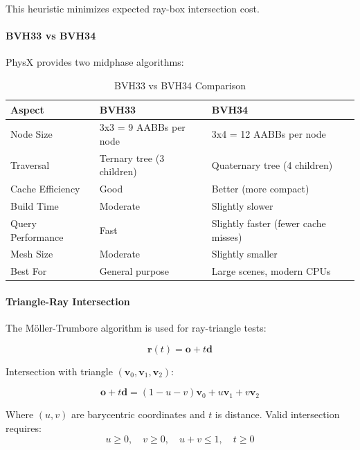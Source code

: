 This heuristic minimizes expected ray-box intersection cost.

\paragraph{BVH33 vs BVH34}

PhysX provides two midphase algorithms:

\begin{table}[h]
\centering
\begin{tabular}{|l|p{6cm}|p{6cm}|}
\hline
\textbf{Aspect} & \textbf{BVH33} & \textbf{BVH34} \\
\hline
Node Size & 3x3 = 9 AABBs per node & 3x4 = 12 AABBs per node \\
\hline
Traversal & Ternary tree (3 children) & Quaternary tree (4 children) \\
\hline
Cache Efficiency & Good & Better (more compact) \\
\hline
Build Time & Moderate & Slightly slower \\
\hline
Query Performance & Fast & Slightly faster (fewer cache misses) \\
\hline
Mesh Size & Moderate & Slightly smaller \\
\hline
Best For & General purpose & Large scenes, modern CPUs \\
\hline
\end{tabular}
\caption{BVH33 vs BVH34 Comparison}
\end{table}

\paragraph{Triangle-Ray Intersection}

The Möller-Trumbore algorithm is used for ray-triangle tests:

\begin{equation}
\mathbf{r}(t) = \mathbf{o} + t\mathbf{d}
\end{equation}

Intersection with triangle $(\mathbf{v}_0, \mathbf{v}_1, \mathbf{v}_2)$:

\begin{equation}
\mathbf{o} + t\mathbf{d} = (1-u-v)\mathbf{v}_0 + u\mathbf{v}_1 + v\mathbf{v}_2
\end{equation}

Where $(u, v)$ are barycentric coordinates and $t$ is distance. Valid intersection requires:
\begin{equation}
u \geq 0, \quad v \geq 0, \quad u+v \leq 1, \quad t \geq 0
\end{equation}

